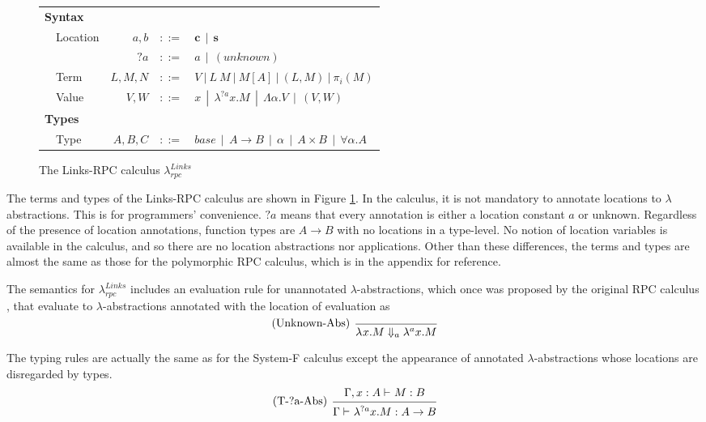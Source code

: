 \documentclass[a4paper]{article}
\theoremstyle{plain}
\theoremstyle{definition}
\newcommand{\ruleverticalsep}{0.5cm}
\newcommand{\linksrpc}{$\lambda_{rpc}^{Links}$\xspace}
\newcommand{\client}{\textbf{c}}
\newcommand{\server}{\textbf{s}}
\newcommand{\evalRPC}[3]{#1\Downarrow_{#2}#3}
\newcommand{\lamL}[3]{\lambda^{#1}#2.#3}
\newcommand{\tyenv}{\Gamma}
\newcommand{\tyenvExt}[2]{\Gamma,#1:#2}
\newcommand{\typing}[4]{#1\vdash_{#2} #3 : #4}
\begin{document}
\begin{figure}[h]
\centering  
\begin{tabular}{ l  l  r  c  l }
\multicolumn{5}{l}{\textbf{Syntax}} \\
 & Location & $a,b$   & $::=$ & $\client \ \ | \  \  \server$ \\
 &          & $?a$    & $::=$  & $a  \ \ |  \ \ (unknown) $ \\
 & Term     & $L,M,N$ & $::=$  & $V  \ | \  L \ M  \ | \  M[A]  \ | \  (L,M)  \ |  \ \pi_i(M)$ \\
 & Value & $V,W$ & $::=$ & $x  \ \ |  \ \ \lambda^{?a} x.M  \ \ |  \ \ \Lambda\alpha.V  \ \ |  \ \ (V,W)$
\\[\ruleverticalsep]
\multicolumn{5}{l}{\textbf{Types}} \\
& Type & $A,B,C$ & $::=$
& $base  \ \ | \ \  A \rightarrow B  \ \ | \ \  \alpha  \ \ | \ \  A \times B  \ \ | \ \  \forall\alpha.A$
\end{tabular}
\caption{The Links-RPC calculus \linksrpc}
\label{fig:linksrpc}
\end{figure}

The terms and types of the Links-RPC calculus are shown in Figure
\ref{fig:linksrpc}.
%
In the calculus, it is not mandatory to annotate locations to
$\lambda$ abstractions. This is for programmers' convenience.
%
$?a$ means that every annotation is either a location constant $a$ or
unknown.
%
Regardless of the presence of location annotations, function types are
$A \rightarrow B$ with no locations in a type-level.
%
No notion of location variables is available in the calculus, and so
there are no location abstractions nor applications.
%
Other than these differences, the terms and types are almost the same
as those for the polymorphic RPC calculus, which
is in the appendix for reference.
%


The semantics for \linksrpc includes an evaluation rule for
unannotated $\lambda$-abstractions, which once was proposed by the
original RPC calculus \cite{Cooper:2009:RC:1599410.1599439}, that
evaluate to $\lambda$-abstractions annotated with the location of
evaluation as
\[
\begin{prooftree}
  \infer[left label=(Unknown-Abs)]0{ \evalRPC{\lamL{}{x}{M}}{a}{\lamL{a}{x}{M} }}
\end{prooftree}
\]
%

The typing rules are actually the same as for the System-F calculus
except the appearance of annotated $\lambda$-abstractions whose
locations are disregarded by types.
%
\[
\begin{prooftree}
  \hypo{ \typing{\tyenvExt{x}{A}}{}{M}{B} }
  \infer[left label=(T-?a-Abs)]1{ \typing{\tyenv}{}{\lamL{?a}{x}{M}}{A \rightarrow B} }
\end{prooftree}
\]
\end{document}
